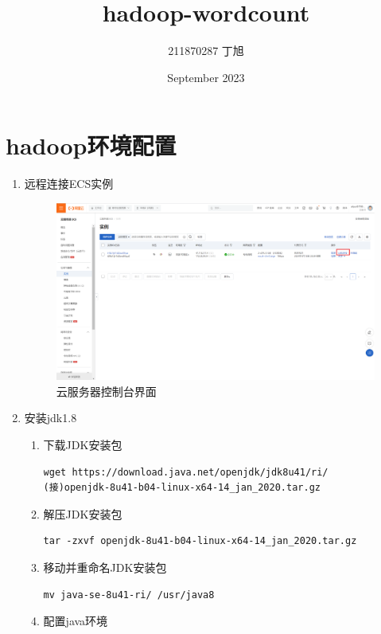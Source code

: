 \documentclass{article}
\title{hadoop-wordcount}
\author{211870287 丁旭 }
\date{September 2023}
\begin{document}
\maketitle

\section{hadoop环境配置}
\begin{enumerate}

    \item 远程连接ECS实例
        \par 
        \begin{figure}[htp]
            \centering
            \includegraphics[width=15cm]{远程连接}
            \caption{云服务器控制台界面}
            \label{fig:galaxy}
        \end{figure}
    \item 安装jdk1.8

        \begin{enumerate}
            \item 下载JDK安装包
            
            \begin{lstlisting}
wget https://download.java.net/openjdk/jdk8u41/ri/ 
(接)openjdk-8u41-b04-linux-x64-14_jan_2020.tar.gz
            \end{lstlisting}
            \item 解压JDK安装包
            
            \begin{lstlisting}
tar -zxvf openjdk-8u41-b04-linux-x64-14_jan_2020.tar.gz
            \end{lstlisting}
            \item 移动并重命名JDK安装包
            
            \begin{lstlisting}
mv java-se-8u41-ri/ /usr/java8
            \end{lstlisting}
            \item 配置java环境
            

\end{enumerate}
\end{enumerate}
\end{document}
